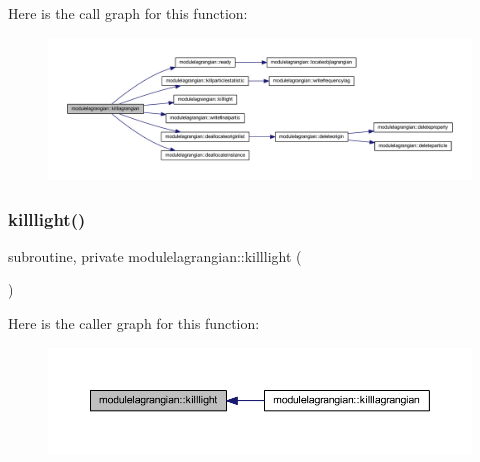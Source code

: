 Here is the call graph for this function\+:\nopagebreak
\begin{figure}[H]
\begin{center}
\leavevmode
\includegraphics[width=350pt]{namespacemodulelagrangian_a18d99349731a3f837e18c16f49c3743f_cgraph}
\end{center}
\end{figure}
\mbox{\label{namespacemodulelagrangian_a2f00972bf015601fb8181bb28eb89850}} 
\subsubsection{\texorpdfstring{killlight()}{killlight()}}
{\footnotesize\ttfamily subroutine, private modulelagrangian\+::killlight (\begin{DoxyParamCaption}{ }\end{DoxyParamCaption})\hspace{0.3cm}{\ttfamily [private]}}

Here is the caller graph for this function\+:\nopagebreak
\begin{figure}[H]
\begin{center}
\leavevmode
\includegraphics[width=350pt]{namespacemodulelagrangian_a2f00972bf015601fb8181bb28eb89850_icgraph}
\end{center}
\end{figure}
\mbox{\label{namespacemodulelagrangian_acabd7df16f5abd0459a4a8e198526f3d}} 
